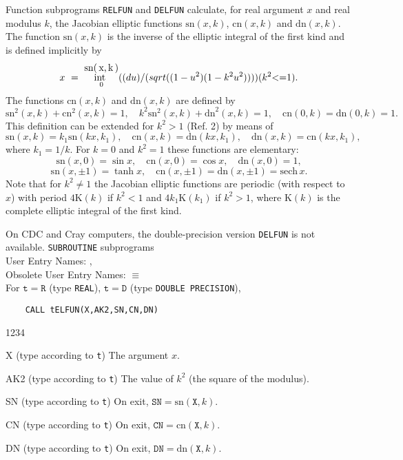                        
           
\Submitter{}                   
                      
Function subprograms {\tt RELFUN} and {\tt DELFUN} calculate, for real
argument $x$ and real modulus $k$, the Jacobian elliptic functions
$\mathrm{sn}(x,k)$, $\mathrm{cn}(x,k)$ and $\mathrm{dn}(x,k)$.
The function $\mathrm{sn}(x,k)$ is the inverse of the elliptic
integral of the first kind and is defined implicitly by
$$ x \ = \ \displaystyle \int_0^{\mbox{\small sn(\,{\it x,\,k}\,)}}
\frac{du}{\sqrt{(1-u^2)(1-k^2u^2)}} \qquad (k^2 \le 1). $$
The functions $\mathrm{cn}(x,k)$ and $\mathrm{dn}(x,k)$ are defined by
$$ \mathrm{sn}^2(x,k) + \mathrm{cn}^2(x,k) = 1, \quad
k^2 \mathrm{sn}^2(x,k) + \mathrm{dn}^2(x,k) = 1, \quad
\mathrm{cn}(0,k) = \mathrm{dn}(0,k) = 1. $$
This definition can be extended for $k^2 > 1$ (Ref. 2) by means of
$$ \mathrm{sn}(x,k) = k_1 \mathrm{sn}(kx,k_1), \quad
\mathrm{cn}(x,k) = \mathrm{dn}(kx,k_1), \quad
\mathrm{dn}(x,k) = \mathrm{cn}(kx,k_1), $$
where $k_1 = 1/k$.
For $k = 0$ and $k^2 = 1$ these functions are elementary:
$$ \mathrm{sn}(x,0) = \sin x, \quad
\mathrm{cn}(x,0) = \cos x, \quad \mathrm{dn}(x,0) = 1,$$
$$ \mathrm{sn}(x,\pm 1) = \tanh x, \quad
\mathrm{cn}(x,\pm 1) = \mathrm{dn}(x,\pm 1) = \mathrm{sech}\, x.$$
Note that for $k^2 \ne 1$ the Jacobian elliptic functions are periodic
(with respect to $x$) with period $4\mathrm{K}(k)$ if $k^2 < 1$ and
$ 4k_1\mathrm{K}(k_1)$ if $k^2 > 1$, where $\mathrm{K}(k)$
is the complete elliptic integral of the first kind.
\par
On CDC and Cray computers, the double-precision version {\tt DELFUN}
is not available.
\Structure
{\tt SUBROUTINE} subprograms \\
User Entry Names: ,  \\
Obsolete User Entry Names:  $\equiv$  \\
\Usage
For $\mathtt{t=R}$ (type {\tt REAL}), $\mathtt{t=D}$ (type
{\tt DOUBLE PRECISION}),
\begin{verbatim}
    CALL tELFUN(X,AK2,SN,CN,DN)
\end{verbatim}
\begin{DLtt}{1234}
\item[X] (type according to {\tt t}) The argument $x$.
\item[AK2] (type according to {\tt t})
The value of $k^2$ (the square of the modulus).
\item[SN] (type according to {\tt t}) On exit,
$\mathtt{SN}=\mathrm{sn}(\mathtt{X},k)$.
\item[CN] (type according to {\tt t}) On exit,
$\mathtt{CN}=\mathrm{cn}(\mathtt{X},k)$.
\item[DN] (type according to {\tt t}) On exit,
$\mathtt{DN}=\mathrm{dn}(\mathtt{X},k)$.
\end{DLtt}
